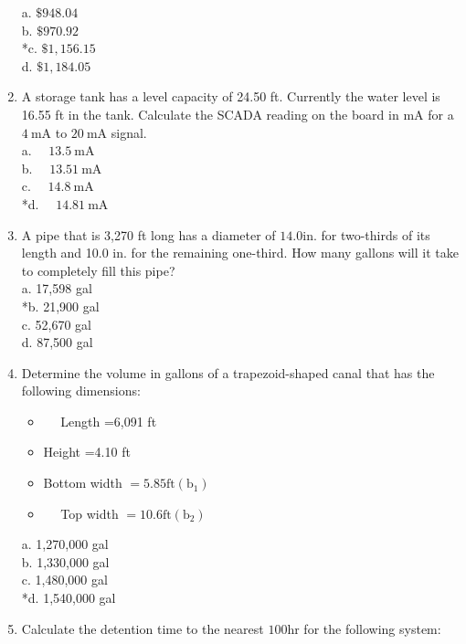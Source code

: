\begin{enumerate}
a. $\$ 948.04$\\
b. $\$ 970.92$\\
*c. $\$ 1,156.15$\\
d. $\$ 1,184.05$\\
\item A storage tank has a level capacity of 24.50 ft. Currently the water level is 16.55 ft in the tank. Calculate the SCADA reading on the board in $\mathrm{mA}$ for a $4 \mathrm{~mA}$ to $20 \mathrm{~mA}$ signal.\\
a. $\quad 13.5 \mathrm{~mA}$\\
b. $\quad 13.51 \mathrm{~mA}$\\
c. $\quad 14.8 \mathrm{~mA}$\\
*d. $\quad 14.81 \mathrm{~mA}$\\
\item A pipe that is 3,270 ft long has a diameter of $14.0 \mathrm{in}$. for two-thirds of its length and 10.0 in. for the remaining one-third. How many gallons will it take to completely fill this pipe?\\
a. 17,598 gal\\
*b. 21,900 gal\\
c. 52,670 gal\\
d. 87,500 gal\\
\item Determine the volume in gallons of a trapezoid-shaped canal that has the following dimensions:\\
\begin{itemize}
\item $\quad$ Length =6,091 ft\\
\item Height =4.10 ft\\
\item Bottom width $=5.85 \mathrm{ft}\left(\mathrm{b}_{1}\right)$\\
\item $\quad$ Top width $=10.6 \mathrm{ft}\left(\mathrm{b}_{2}\right)$\\
  \end{itemize}
a. 1,270,000 gal\\
b. 1,330,000 gal\\
c. 1,480,000 gal\\
*d. 1,540,000 gal\\
\item Calculate the detention time to the nearest $100 \mathrm{hr}$ for the following system:\\
\begin{itemize}

\end{itemize}
\end{enumerate}

